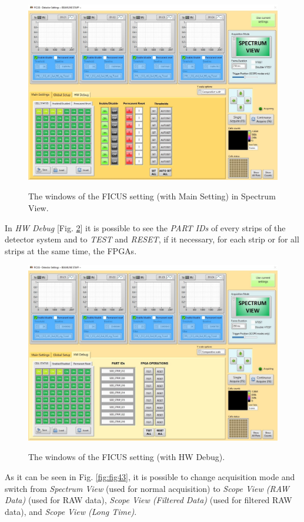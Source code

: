 \documentclass[a4paper,12pt,oneside,pdflatex,italian,final,twocolumn]{article}
\begin{document}
\begin{figure}[h]
\centering
{\includegraphics[width=.85\textwidth]{Capture57.jpg}} \quad
\caption{The windows of the FICUS setting (with Main Setting) in Spectrum View.}\label{fig:fig41}
\end{figure}

In \textit{HW Debug} [Fig. \ref{fig:fig42}] it is possible to see the \textit{PART IDs} of every strips of the detector system and to \textit{TEST} and \textit{RESET}, if it necessary, for each strip or for all strips at the same time, the FPGAs.

\begin{figure}[h]
\centering
{\includegraphics[width=.85\textwidth]{Capture59.jpg}} \quad
\caption{The windows of the FICUS setting (with HW Debug).}\label{fig:fig42}
\end{figure}


As it can be seen in Fig. \ref{fig:fig43}, it is possible to change acquisition mode and switch from \textit{Spectrum View} (used for normal acquisition) to \textit{Scope View (RAW Data)} (used for RAW data), \textit{Scope View (Filtered Data)} (used for filtered RAW data), and \textit{Scope View (Long Time)}.
\end{document}
